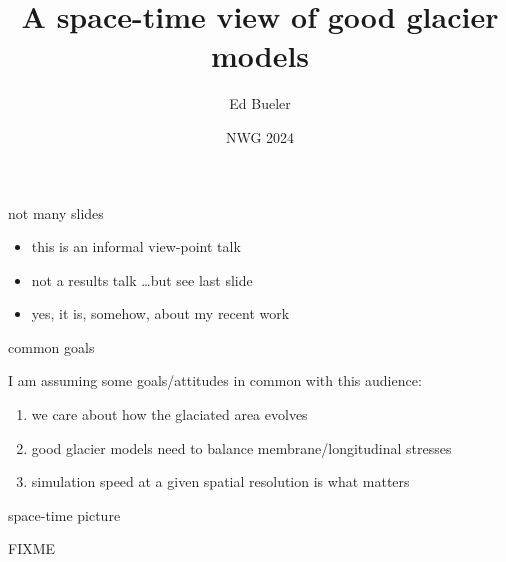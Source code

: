 \documentclass[10pt,dvipsnames]{beamer}
\title{A space-time view of good glacier models}
\date{NWG 2024}
\author{Ed Bueler}
\institute{University of Alaska Fairbanks}
\begin{document}
\graphicspath{{figs/}}

\maketitle





\begin{frame}{not many slides}

\begin{itemize}
\item this is an informal view-point talk
\item<2> not a results talk \hfill \dots but see last slide
\item<2> yes, it is, somehow, about my recent work
\end{itemize}
\end{frame}


\begin{frame}{common goals}

I am assuming some goals/attitudes in common with this audience:
\begin{enumerate}
\item we care about how the glaciated area evolves
\item good glacier models need to balance membrane/longitudinal stresses
\item simulation speed at a given spatial resolution is what matters
\end{enumerate}
\end{frame}


\begin{frame}{space-time picture}

\begin{center}
FIXME%
\end{center}
\end{frame}
\end{document}
